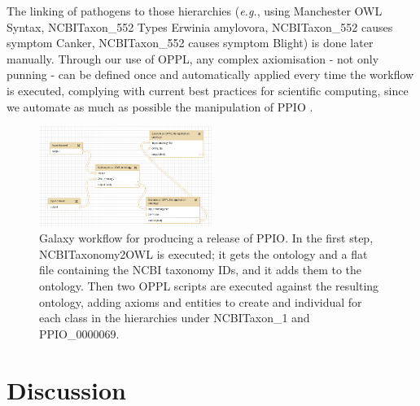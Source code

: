 \documentclass[sw]{iosart2c}
\newcommand{\eg}{\emph{e.g.}\xspace}
\begin{document}
The linking of pathogens to those hierarchies (\eg, using Manchester OWL Syntax, {\sf NCBITaxon\_552 Types Erwinia amylovora}, {\sf NCBITaxon\_552 causes symptom Canker}, {\sf NCBITaxon\_552 causes symptom Blight}) is done later manually. Through our use of OPPL, any complex axiomisation - not only punning - can be defined once and automatically applied every time the workflow is executed, complying with current best practices for scientific computing, since we automate as much as possible the manipulation of PPIO \cite{bp_computing}.

\begin{figure}
\includegraphics[width=0.5\textwidth]{galaxy-workflow.png}
\caption{Galaxy workflow for producing a release of PPIO. In the first step, NCBITaxonomy2OWL is executed; it gets the ontology and a flat file containing the NCBI taxonomy IDs, and it adds them to the ontology. Then two OPPL scripts are executed against the resulting ontology, adding axioms and entities to create and individual for each class in the hierarchies under {\sf NCBITaxon\_1} and {\sf PPIO\_0000069}.}\label{fig:galaxy-workflow}
\end{figure}


\section{Discussion}\label{sec:discussion}
\end{document}
